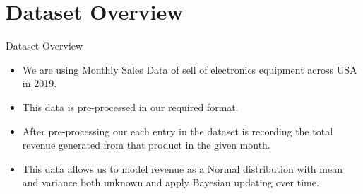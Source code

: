 \section{Dataset Overview}

\begin{frame}{Dataset Overview}

  \begin{itemize}

    \item We are using Monthly Sales Data of sell of electronics equipment across USA in 2019.
    \item This data is pre-processed in our required format.
    \item After pre-processing our each entry in the dataset is recording the total revenue generated from that product in the given month.
    \item This data allows us to model revenue as a Normal distribution with mean and variance both unknown and apply Bayesian updating over time.
  \end{itemize}
  
\end{frame}
